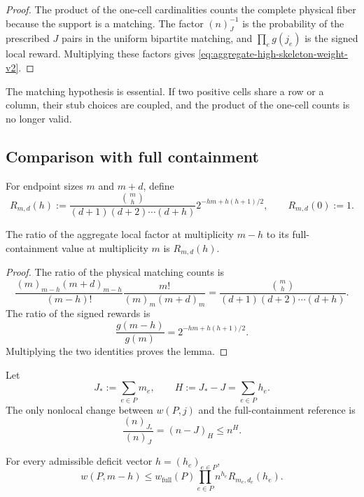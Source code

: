 \begin{proof}
The product of the one-cell cardinalities counts the complete physical fiber
because the support is a matching.  The factor $(n)_J^{-1}$ is the probability
of the prescribed $J$ pairs in the uniform bipartite matching, and
$\prod_e g(j_e)$ is the signed local reward.  Multiplying these factors gives
\eqref{eq:aggregate-high-skeleton-weight-v2}.
\end{proof}

The matching hypothesis is essential.  If two positive cells share a row or a
column, their stub choices are coupled, and the product of the one-cell counts
is no longer valid.

\subsection{Comparison with full containment}

For endpoint sizes $m$ and $m+d$, define
\begin{equation}
  R_{m,d}(h)
  :=
  \frac{\binom mh}{(d+1)(d+2)\cdots(d+h)}
  2^{-hm+h(h+1)/2},
  \qquad R_{m,d}(0):=1.
  \label{eq:local-deficit-ratio-ams-v2}
\end{equation}

\begin{lemma}
\label{lem:exact-local-ratio-ams-v2}
The ratio of the aggregate local factor at multiplicity $m-h$ to its
full-containment value at multiplicity $m$ is $R_{m,d}(h)$.
\end{lemma}

\begin{proof}
The ratio of the physical matching counts is
\[
  \frac{(m)_{m-h}(m+d)_{m-h}}{(m-h)!}
  \frac{m!}{(m)_m(m+d)_m}
  =
  \frac{\binom mh}{(d+1)(d+2)\cdots(d+h)}.
\]
The ratio of the signed rewards is
\[
  \frac{g(m-h)}{g(m)}
  =
  2^{-hm+h(h+1)/2}.
\]
Multiplying the two identities proves the lemma.
\end{proof}

Let
\[
  J_*:=\sum_{e\in P}m_e,
  \qquad
  H:=J_*-J=\sum_{e\in P}h_e.
\]
The only nonlocal change between $w(P,j)$ and the full-containment reference is
\[
  \frac{(n)_{J_*}}{(n)_J}
  =(n-J)_H
  \le n^H.
\]

\begin{lemma}
\label{lem:aggregate-deficit-comparison-ams-v2}
For every admissible deficit vector $h=(h_e)_{e\in P}$,
\begin{equation}
  w(P,m-h)
  \le
  w_{\mathrm{full}}(P)
  \prod_{e\in P}n^{h_e}R_{m_e,d_e}(h_e).
  \label{eq:aggregate-deficit-comparison-ams-v2}
\end{equation}
\end{lemma}

